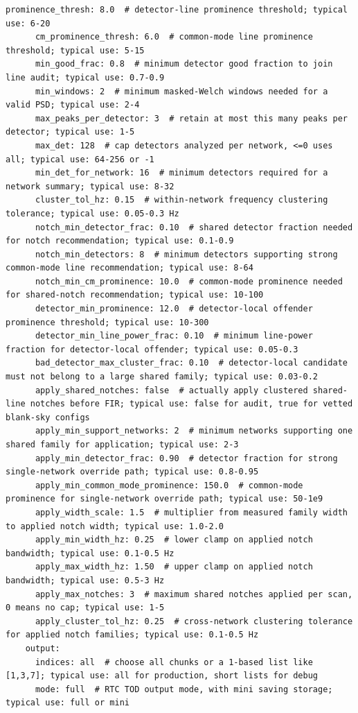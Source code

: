 \documentclass[11pt]{article}
\begin{document}
\begin{lstlisting}[language={}]
      prominence_thresh: 8.0  # detector-line prominence threshold; typical use: 6-20
      cm_prominence_thresh: 6.0  # common-mode line prominence threshold; typical use: 5-15
      min_good_frac: 0.8  # minimum detector good fraction to join line audit; typical use: 0.7-0.9
      min_windows: 2  # minimum masked-Welch windows needed for a valid PSD; typical use: 2-4
      max_peaks_per_detector: 3  # retain at most this many peaks per detector; typical use: 1-5
      max_det: 128  # cap detectors analyzed per network, <=0 uses all; typical use: 64-256 or -1
      min_det_for_network: 16  # minimum detectors required for a network summary; typical use: 8-32
      cluster_tol_hz: 0.15  # within-network frequency clustering tolerance; typical use: 0.05-0.3 Hz
      notch_min_detector_frac: 0.10  # shared detector fraction needed for notch recommendation; typical use: 0.1-0.9
      notch_min_detectors: 8  # minimum detectors supporting strong common-mode line recommendation; typical use: 8-64
      notch_min_cm_prominence: 10.0  # common-mode prominence needed for shared-notch recommendation; typical use: 10-100
      detector_min_prominence: 12.0  # detector-local offender prominence threshold; typical use: 10-300
      detector_min_line_power_frac: 0.10  # minimum line-power fraction for detector-local offender; typical use: 0.05-0.3
      bad_detector_max_cluster_frac: 0.10  # detector-local candidate must not belong to a large shared family; typical use: 0.03-0.2
      apply_shared_notches: false  # actually apply clustered shared-line notches before FIR; typical use: false for audit, true for vetted blank-sky configs
      apply_min_support_networks: 2  # minimum networks supporting one shared family for application; typical use: 2-3
      apply_min_detector_frac: 0.90  # detector fraction for strong single-network override path; typical use: 0.8-0.95
      apply_min_common_mode_prominence: 150.0  # common-mode prominence for single-network override path; typical use: 50-1e9
      apply_width_scale: 1.5  # multiplier from measured family width to applied notch width; typical use: 1.0-2.0
      apply_min_width_hz: 0.25  # lower clamp on applied notch bandwidth; typical use: 0.1-0.5 Hz
      apply_max_width_hz: 1.50  # upper clamp on applied notch bandwidth; typical use: 0.5-3 Hz
      apply_max_notches: 3  # maximum shared notches applied per scan, 0 means no cap; typical use: 1-5
      apply_cluster_tol_hz: 0.25  # cross-network clustering tolerance for applied notch families; typical use: 0.1-0.5 Hz
    output:
      indices: all  # choose all chunks or a 1-based list like [1,3,7]; typical use: all for production, short lists for debug
      mode: full  # RTC TOD output mode, with mini saving storage; typical use: full or mini
\end{lstlisting}
\end{document}
